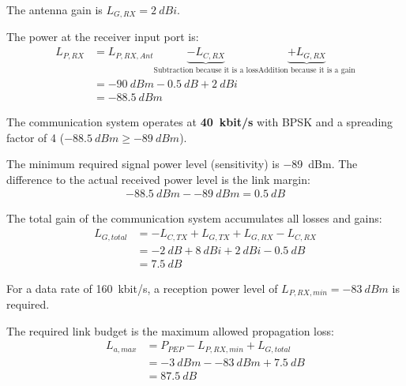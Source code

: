 \begin{solution}
\begin{tasks}
		The antenna gain is $L_{G,RX} = \SI{2}{dBi}$.
		
		The power at the receiver input port is:
		\begin{equation*}
			\begin{split}
				L_{P,RX} &= L_{P,RX,Ant} \underbrace{- L_{C,RX}}_{\text{Subtraction because it is a loss}} \underbrace{+ L_{G,RX}}_{\text{Addition because it is a gain}} \\
				 &= \SI{-90}{dBm} - \SI{0.5}{dB} + \SI{2}{dBi} \\
				 &= \SI{-88.5}{dBm}
			\end{split}
		\end{equation*}
	
		\task
		The communication system operates at \textbf{\SI{40}{kbit/s}} with BPSK and a spreading factor of \num{4} ($\SI{-88.5}{dBm} \geq \SI{-89}{dBm}$).
		
		\task
		The minimum required signal power level (sensitivity) is \SI{-89}{dBm}. The difference to the actual received power level is the link margin:
		\begin{equation*}
			\begin{split}
				\SI{-88.5}{dBm} - \SI{-89}{dBm} = \SI{0.5}{dB}
			\end{split}
		\end{equation*}
		
		\task
		The total gain of the communication system accumulates all losses and gains:
		\begin{equation*}
			\begin{split}
				L_{G,total} &= - L_{C,TX} + L_{G,TX} + L_{G,RX} - L_{C,RX} \\
				&= - \SI{2}{dB} + \SI{8}{dBi} + \SI{2}{dBi} - \SI{0.5}{dB} \\
				&= \SI{7.5}{dB}
			\end{split}
		\end{equation*}
		
		For a data rate of \SI{160}{kbit/s}, a reception power level of $L_{P,RX,min} = \SI{-83}{dBm}$ is required.
		
		The required link budget is the maximum allowed propagation loss:
		\begin{equation*}
			\begin{split}
				L_{a,max} &= P_{PEP} - L_{P,RX,min} + L_{G,total} \\
				&= \SI{-3}{dBm} - \SI{-83}{dBm} + \SI{7.5}{dB} \\
				&= \SI{87.5}{dB}
			\end{split}
		\end{equation*}
	

\end{tasks}
\end{solution}
